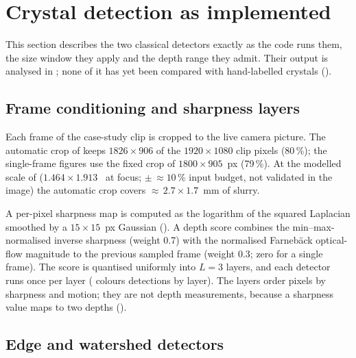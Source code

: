 \providecommand{\pending}[1]{\textbf{[PENDING: #1]}}%
\section{Crystal detection as implemented}\label{sec:detection}

This section describes the two classical detectors exactly as the code runs them, the size window they apply and the
depth range they admit. Their output is analysed in ; none of it has yet been compared with
hand-labelled crystals ().

\subsection{Frame conditioning and sharpness layers}\label{sec:layers}

Each frame of the case-study clip is cropped to the live camera picture. The automatic crop of
 keeps $1826 \times 906$ of the $1920 \times 1080$ clip pixels (80\,\%); the
single-frame figures use the fixed crop of $1800 \times 905$~px (79\,\%). At the modelled scale of 
($1.464 \times 1.913$~\umpx{} at focus; $\pm\,{\approx}10$\,\% input budget, not validated in the image) the
automatic crop covers
${\approx}\,2.7 \times 1.7$~mm of slurry.

A per-pixel sharpness map is computed as the logarithm of the squared Laplacian smoothed by a $15 \times 15$~px
Gaussian (). A depth score combines the min--max-normalised inverse sharpness (weight 0.7)
with the normalised Farneb\"ack optical-flow magnitude to the previous sampled frame (weight 0.3; zero for a single
frame). The score is quantised uniformly into $L = 3$ layers, and each detector runs once per layer
( colours detections by layer). The layers order pixels by sharpness and motion; they are not depth measurements, because a
sharpness value maps to two depths ().

\subsection{Edge and watershed detectors}\label{sec:edge}

